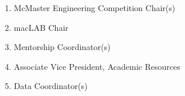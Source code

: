 \begin{enumerate}
  \begin{enumerate}
   \item
    McMaster Engineering Competition Chair(s)
   \item
    macLAB Chair
   \item
    Mentorship Coordinator(s)
   \item
    Associate Vice President, Academic Resources
    \item
    Data Coordinator(s)

  \end{enumerate}
\end{enumerate}